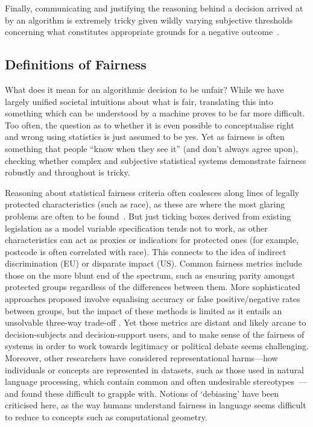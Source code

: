 \documentclass[sigchi-a, authorversion]{acmart}
\begin{document}
Finally, communicating and justifying the reasoning behind a decision arrived at by an algorithm is extremely tricky given wildly varying subjective thresholds concerning what constitutes appropriate grounds for a negative outcome~\cite{binns2018reducing}.

\subsection{Definitions of Fairness}


What does it mean for an algorithmic decision to be unfair? While we have largely unified societal intuitions about what is fair, translating this into something which can be understood by a machine proves to be far more difficult. Too often, the question as to whether it is even possible to conceptualise right and wrong using statistics is just assumed to be yes. Yet as fairness is often something that people ``know when they see it'' (and don't always agree upon), checking whether complex and subjective statistical systems demonstrate fairness robustly and throughout is tricky.

Reasoning about statistical fairness criteria often coalesces along lines of legally protected characteristics (such as race), as these are where the most glaring problems are often to be found~\cite{barocas2016big}. But just ticking boxes derived from existing legislation as a model variable specification tends not to work, as other characteristics can act as proxies or indicatiors for protected ones (for example, postcode is often correlated with race). This connects to the idea of indirect discrimination (EU) or disparate impact (US). Common fairness metrics include those on the more blunt end of the spectrum, such as ensuring parity amongst protected groups regardless of the differences between them. More sophisticated approaches proposed involve equalising accuracy or false positive/negative rates between groups, but the impact of these methods is limited as it entails an unsolvable three-way trade-off \cite{chouldechova2017fair}. Yet these metrics are distant and likely arcane to decision-subjects and decision-support users, and to make sense of the fairness of systems in order to work towards legitimacy or political debate seems challenging. Moreover, other researchers have considered representational harms---how individuals or concepts are represented in datasets, such as those used in natural language processing, which contain common and often undesirable stereotypes~\cite{BolukbasiCZSK16a}---and found these difficult to grapple with. Notions of `debiasing' have been criticised here, as the way humans understand fairness in language seems difficult to reduce to concepts such as computational geometry. 
\end{document}
